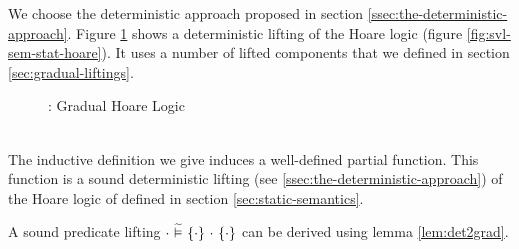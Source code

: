 We choose the deterministic approach proposed in section \ref{ssec:the-deterministic-approach}.
Figure \ref{fig:gvl-sem-stat-hoare} shows a deterministic lifting of the Hoare logic (figure \ref{fig:svl-sem-stat-hoare}).
It uses a number of lifted components that we defined in section \ref{sec:gradual-liftings}.
\begin{figure}[h!]
    
    \caption{\gvl: Gradual Hoare Logic} 
    \label{fig:gvl-sem-stat-hoare}
\end{figure}

\begin{lemma}\label{lemma:gvlidf-sdl-hl}~\\
    The inductive definition we give induces a well-defined partial function.
    This function is a sound deterministic lifting (see \ref{ssec:the-deterministic-approach}) of the Hoare logic of \svlidf defined in section \ref{sec:static-semantics}.
\end{lemma}

A sound predicate lifting ${\cdot} \,\,\widetilde{\vDash}\,\, \{{\cdot}\} ~{\cdot}~ \{{\cdot}\}$ can be derived using lemma \ref{lem:det2grad}.